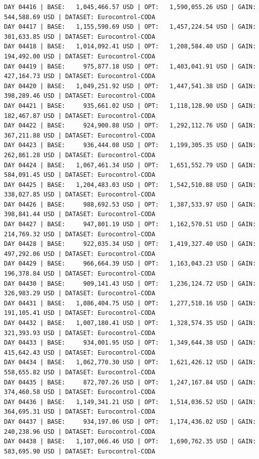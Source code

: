 \documentclass[11pt,a4paper]{article}
\begin{document}
\begin{verbatim}
DAY 04416 | BASE:   1,045,466.57 USD | OPT:   1,590,055.26 USD | GAIN: 544,588.69 USD | DATASET: Eurocontrol-CODA
DAY 04417 | BASE:   1,155,590.69 USD | OPT:   1,457,224.54 USD | GAIN: 301,633.85 USD | DATASET: Eurocontrol-CODA
DAY 04418 | BASE:   1,014,092.41 USD | OPT:   1,208,584.40 USD | GAIN: 194,492.00 USD | DATASET: Eurocontrol-CODA
DAY 04419 | BASE:     975,877.18 USD | OPT:   1,403,041.91 USD | GAIN: 427,164.73 USD | DATASET: Eurocontrol-CODA
DAY 04420 | BASE:   1,049,251.92 USD | OPT:   1,447,541.38 USD | GAIN: 398,289.46 USD | DATASET: Eurocontrol-CODA
DAY 04421 | BASE:     935,661.02 USD | OPT:   1,118,128.90 USD | GAIN: 182,467.87 USD | DATASET: Eurocontrol-CODA
DAY 04422 | BASE:     924,900.88 USD | OPT:   1,292,112.76 USD | GAIN: 367,211.88 USD | DATASET: Eurocontrol-CODA
DAY 04423 | BASE:     936,444.08 USD | OPT:   1,199,305.35 USD | GAIN: 262,861.28 USD | DATASET: Eurocontrol-CODA
DAY 04424 | BASE:   1,067,461.34 USD | OPT:   1,651,552.79 USD | GAIN: 584,091.45 USD | DATASET: Eurocontrol-CODA
DAY 04425 | BASE:   1,204,483.03 USD | OPT:   1,542,510.88 USD | GAIN: 338,027.85 USD | DATASET: Eurocontrol-CODA
DAY 04426 | BASE:     988,692.53 USD | OPT:   1,387,533.97 USD | GAIN: 398,841.44 USD | DATASET: Eurocontrol-CODA
DAY 04427 | BASE:     947,801.19 USD | OPT:   1,162,570.51 USD | GAIN: 214,769.32 USD | DATASET: Eurocontrol-CODA
DAY 04428 | BASE:     922,035.34 USD | OPT:   1,419,327.40 USD | GAIN: 497,292.06 USD | DATASET: Eurocontrol-CODA
DAY 04429 | BASE:     966,664.39 USD | OPT:   1,163,043.23 USD | GAIN: 196,378.84 USD | DATASET: Eurocontrol-CODA
DAY 04430 | BASE:     909,141.43 USD | OPT:   1,236,124.72 USD | GAIN: 326,983.29 USD | DATASET: Eurocontrol-CODA
DAY 04431 | BASE:   1,086,404.75 USD | OPT:   1,277,510.16 USD | GAIN: 191,105.41 USD | DATASET: Eurocontrol-CODA
DAY 04432 | BASE:   1,007,180.41 USD | OPT:   1,328,574.35 USD | GAIN: 321,393.93 USD | DATASET: Eurocontrol-CODA
DAY 04433 | BASE:     934,001.95 USD | OPT:   1,349,644.38 USD | GAIN: 415,642.43 USD | DATASET: Eurocontrol-CODA
DAY 04434 | BASE:   1,062,770.30 USD | OPT:   1,621,426.12 USD | GAIN: 558,655.82 USD | DATASET: Eurocontrol-CODA
DAY 04435 | BASE:     872,707.26 USD | OPT:   1,247,167.84 USD | GAIN: 374,460.58 USD | DATASET: Eurocontrol-CODA
DAY 04436 | BASE:   1,149,341.21 USD | OPT:   1,514,036.52 USD | GAIN: 364,695.31 USD | DATASET: Eurocontrol-CODA
DAY 04437 | BASE:     934,197.06 USD | OPT:   1,174,436.02 USD | GAIN: 240,238.96 USD | DATASET: Eurocontrol-CODA
DAY 04438 | BASE:   1,107,066.46 USD | OPT:   1,690,762.35 USD | GAIN: 583,695.90 USD | DATASET: Eurocontrol-CODA

\end{verbatim}
\end{document}
